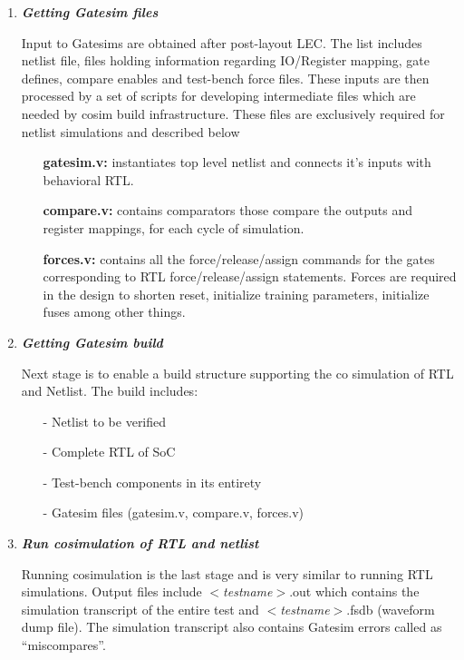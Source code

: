 \begin{enumerate}
	\item \emph{\bf Getting Gatesim files}

	Input to Gatesims are obtained after post-layout LEC. The list includes netlist file, files holding information regarding IO/Register mapping, gate defines, compare enables and test-bench force files. These inputs are then processed by a set of scripts for developing intermediate files which are needed by cosim build infrastructure. These files are exclusively required for netlist simulations and described below
	\begin{itemize}
		\item[]{\bf gatesim.v:} instantiates top level netlist and connects it's inputs with behavioral RTL.
		\item[]{\bf compare.v:} contains comparators those compare the outputs and register mappings, for each cycle of simulation.
		\item[]{\bf forces.v:} contains all the force/release/assign commands for the gates corresponding to RTL force/release/assign statements. Forces are required in the design to shorten reset, initialize training parameters, initialize fuses among other things.
	\end{itemize}

	\item \emph{\bf Getting Gatesim build} 

	Next stage is to enable a build structure supporting the co simulation of RTL and Netlist. The build includes:
	\begin{itemize}
		\item[-]Netlist to be verified
		\item[-]Complete RTL of SoC
		\item[-]Test-bench components in its entirety
		\item[-]Gatesim files (gatesim.v, compare.v, forces.v)
	\end{itemize}

	\item \emph{\bf Run cosimulation of RTL and netlist}

	Running cosimulation is the last stage and is very similar to running RTL simulations. Output files include $<${\it testname}$>$.out which contains the simulation transcript of the entire test and $<${\it testname}$>$.fsdb (waveform dump file). The simulation transcript also contains Gatesim errors called as ``miscompares''.
\end{enumerate}


